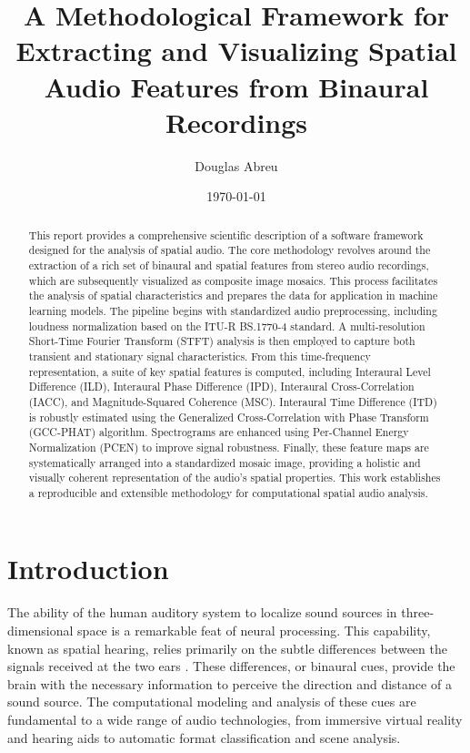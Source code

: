 \documentclass[12pt, a4paper]{article}
\title{A Methodological Framework for Extracting and Visualizing Spatial Audio Features from Binaural Recordings}
\author{Douglas Abreu}
\date{\today}
\begin{document}
\maketitle

\begin{abstract}
\noindent This report provides a comprehensive scientific description of a software framework designed for the analysis of spatial audio. The core methodology revolves around the extraction of a rich set of binaural and spatial features from stereo audio recordings, which are subsequently visualized as composite image mosaics. This process facilitates the analysis of spatial characteristics and prepares the data for application in machine learning models. The pipeline begins with standardized audio preprocessing, including loudness normalization based on the ITU-R BS.1770-4 standard. A multi-resolution Short-Time Fourier Transform (STFT) analysis is then employed to capture both transient and stationary signal characteristics. From this time-frequency representation, a suite of key spatial features is computed, including Interaural Level Difference (ILD), Interaural Phase Difference (IPD), Interaural Cross-Correlation (IACC), and Magnitude-Squared Coherence (MSC). Interaural Time Difference (ITD) is robustly estimated using the Generalized Cross-Correlation with Phase Transform (GCC-PHAT) algorithm. Spectrograms are enhanced using Per-Channel Energy Normalization (PCEN) to improve signal robustness. Finally, these feature maps are systematically arranged into a standardized mosaic image, providing a holistic and visually coherent representation of the audio's spatial properties. This work establishes a reproducible and extensible methodology for computational spatial audio analysis.
\end{abstract}

\section{Introduction}

The ability of the human auditory system to localize sound sources in three-dimensional space is a remarkable feat of neural processing. This capability, known as spatial hearing, relies primarily on the subtle differences between the signals received at the two ears \cite{blauert1997spatial}. These differences, or binaural cues, provide the brain with the necessary information to perceive the direction and distance of a sound source. The computational modeling and analysis of these cues are fundamental to a wide range of audio technologies, from immersive virtual reality and hearing aids to automatic format classification and scene analysis.
\end{document}
